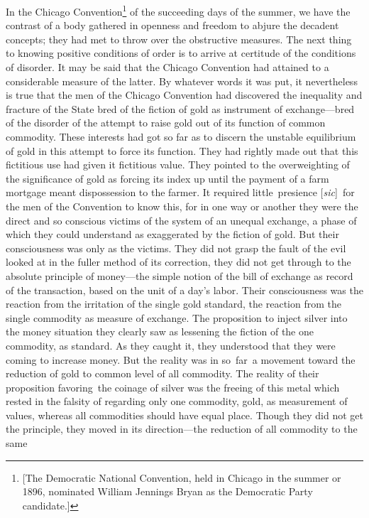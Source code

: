\documentclass[openany,nobib]{tufte-book}
\begin{document}
In the Chicago Convention\footnote{{[}The Democratic National
  Convention, held in Chicago in the summer or 1896, nominated William
  Jennings Bryan as the Democratic Party candidate.{]}} of the
succeeding days of the summer, we have the contrast of a body gathered
in openness and freedom to abjure the decadent concepts; they had met to
throw over the obstructive measures. The next thing to knowing positive
conditions of order is to arrive at certitude of the conditions of
disorder. It may be said that the Chicago Convention had attained to a
considerable measure of the latter. By whatever words it was put, it
nevertheless is true that the men of the Chicago Convention had
discovered the inequality and fracture of the State bred of the fiction
of gold as instrument of exchange---bred of the disorder of the attempt
to raise gold out of its function of common commodity. These interests
had got so far as to discern the unstable equilibrium of gold in this
attempt to force its function. They had rightly made out that this
fictitious use had given it fictitious value. They pointed to the
overweighting of the significance of gold as forcing its index up until
the payment of a farm mortgage meant dispossession to the farmer. It
required little~presience {[}\emph{sic}{]}~for the men of the Convention
to know this, for in one way or another they were the direct and so
conscious victims of the system of an unequal exchange, a phase of which
they could understand as exaggerated by the fiction of gold. But their
consciousness was only as the victims. They did not grasp the fault of
the evil looked at in the fuller method of its correction, they did not
get through to the absolute principle of money---the simple notion of
the bill of exchange as record of the transaction, based on the unit of
a day's labor. Their consciousness was the reaction from the irritation
of the single gold standard, the reaction from the single commodity as
measure of exchange. The proposition to inject silver into the money
situation they clearly saw as lessening the fiction of the one
commodity, as standard. As they caught it, they understood that they
were coming to increase money. But the reality was in so~far~a movement
toward the reduction of gold to common level of all commodity. The
reality of their proposition favoring~the coinage of silver was the
freeing of this metal which rested in the falsity of regarding only one
commodity, gold, as measurement of values, whereas all commodities
should have equal place. Though they did not get the principle, they
moved in its direction---the reduction of all commodity to the same
\end{document}
